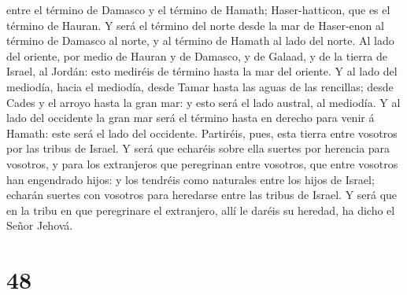 entre el término de Damasco y el término de Hamath; Haser-hatticon, que
es el término de Hauran.  Y será el término del norte
desde la mar de Haser-enon al término de Damasco al norte, y al término
de Hamath al lado del norte.  Al lado del oriente, por
medio de Hauran y de Damasco, y de Galaad, y de la tierra de Israel, al
Jordán: esto mediréis de término hasta la mar del oriente.
 Y al lado del mediodía, hacia el mediodía, desde Tamar
hasta las aguas de las rencillas; desde Cades y el arroyo hasta la gran
mar: y esto será el lado austral, al mediodía.  Y al lado
del occidente la gran mar será el término hasta en derecho para venir á
Hamath: este será el lado del occidente.  Partiréis,
pues, esta tierra entre vosotros por las tribus de Israel.
 Y será que echaréis sobre ella suertes por herencia para
vosotros, y para los extranjeros que peregrinan entre vosotros, que
entre vosotros han engendrado hijos: y los tendréis como naturales entre
los hijos de Israel; echarán suertes con vosotros para heredarse entre
las tribus de Israel.  Y será que en la tribu en que
peregrinare el extranjero, allí le daréis su heredad, ha dicho el Señor
Jehová.

\hypertarget{section-47}{%
\section{48}\label{section-47}}

